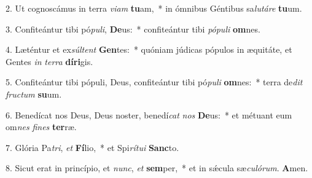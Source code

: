 2. Ut cognoscámus in terra \textit{vi}\textit{am} \textbf{tu}am,~*  in ómnibus Géntibus sa\textit{lu}\textit{tá}\textit{re} \textbf{tu}um.\

3. Confiteántur tibi pó\textit{pu}\textit{li}, \textbf{De}us:~*  confiteántur tibi \textit{pó}\textit{pu}\textit{li} \textbf{om}nes.\

4. Læténtur et ex\textit{súl}\textit{tent} \textbf{Gen}tes:~*  quóniam júdicas pópulos in æquitáte, et Gentes \textit{in} \textit{ter}\textit{ra} \textbf{dí}\textbf{ri}gis.\

5. Confiteántur tibi pópuli, Deus, confiteántur tibi pó\textit{pu}\textit{li} \textbf{om}nes:~*  terra de\textit{dit} \textit{fruc}\textit{tum} \textbf{su}um.\

6. Benedícat nos Deus, Deus noster, benedí\textit{cat} \textit{nos} \textbf{De}us:~*  et métuant eum om\textit{nes} \textit{fi}\textit{nes} \textbf{ter}ræ.\

7. Glória Pa\textit{tri}, \textit{et} \textbf{Fí}lio,~*  et Spi\textit{rí}\textit{tu}\textit{i} \textbf{Sanc}to.\

8. Sicut erat in princípio, et \textit{nunc}, \textit{et} \textbf{sem}per,~*  et in sǽcula sæ\textit{cu}\textit{ló}\textit{rum}. \textbf{A}men.\

